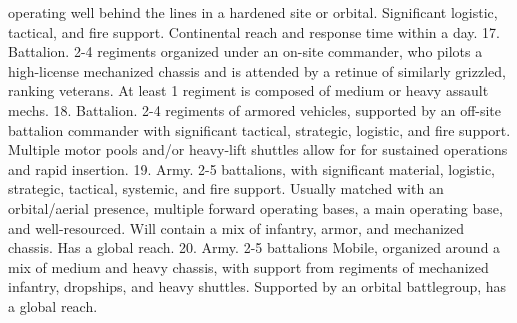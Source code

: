    operating well behind the lines in a hardened site or orbital. Significant logistic, tactical,  
    and fire support. Continental reach and response time within a day.   
17. Battalion. 2-4 regiments organized under an on-site commander, who pilots a high-license  
    mechanized chassis and is attended by a retinue of similarly grizzled, ranking veterans. At  
    least 1 regiment is composed of medium or heavy assault mechs.   
18. Battalion. 2-4 regiments of armored vehicles, supported by an off-site battalion  
    commander with significant tactical, strategic, logistic, and fire support. Multiple motor  
    pools and/or heavy-lift shuttles allow for for sustained operations and rapid insertion.   
19. Army. 2-5 battalions, with significant material, logistic, strategic, tactical, systemic, and fire  
    support. Usually matched with an orbital/aerial presence, multiple forward operating  
    bases, a main operating base, and well-resourced. Will contain a mix of infantry, armor,  
    and mechanized chassis. Has a global reach.   
20. Army. 2-5 battalions Mobile, organized around a mix of medium and heavy chassis, with  
    support from regiments of mechanized infantry, dropships, and heavy shuttles. Supported  
    by an orbital battlegroup, has a global reach.    

                                                                                                        
